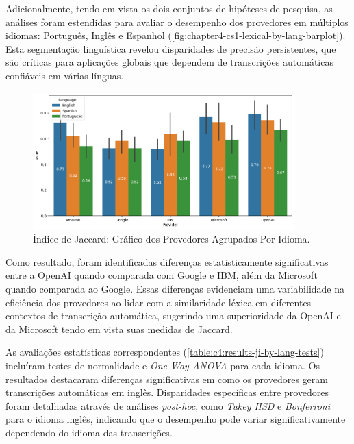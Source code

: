 Adicionalmente, tendo em vista os dois conjuntos de hipóteses de pesquisa, as análises foram estendidas para avaliar o desempenho dos provedores em múltiplos idiomas: Português, Inglês e Espanhol (\autoref{fig:chapter4-cs1-lexical-by-lang-barplot}). Esta segmentação linguística revelou disparidades de precisão persistentes, que são críticas para aplicações globais que dependem de transcrições automáticas confiáveis em várias línguas.

\begin{figure}[htb]
\centering
\caption{Índice de Jaccard: Gráfico dos Provedores Agrupados Por Idioma.}
\label{fig:chapter4-cs1-lexical-by-lang-barplot}
\includegraphics[width=0.9\textwidth]{images/chapter4-cs1-lexical-by-lang-barplot.png}
\end{figure}

Como resultado, foram identificadas diferenças estatisticamente significativas entre a OpenAI quando comparada com Google e IBM, além da Microsoft quando comparada ao Google. Essas diferenças evidenciam uma variabilidade na eficiência dos provedores ao lidar com a similaridade léxica em diferentes contextos de transcrição automática, sugerindo uma superioridade da OpenAI e da Microsoft tendo em vista suas medidas de Jaccard.

As avaliações estatísticas correspondentes (\autoref{table:c4:results-ji-by-lang-tests}) incluíram testes de normalidade e \textit{One-Way ANOVA} para cada idioma. Os resultados destacaram diferenças significativas em como os provedores geram transcrições automáticas em inglês. Disparidades específicas entre provedores foram detalhadas através de análises \textit{post-hoc}, como \textit{Tukey HSD} e \textit{Bonferroni} para o idioma inglês, indicando que o desempenho pode variar significativamente dependendo do idioma das transcrições.


